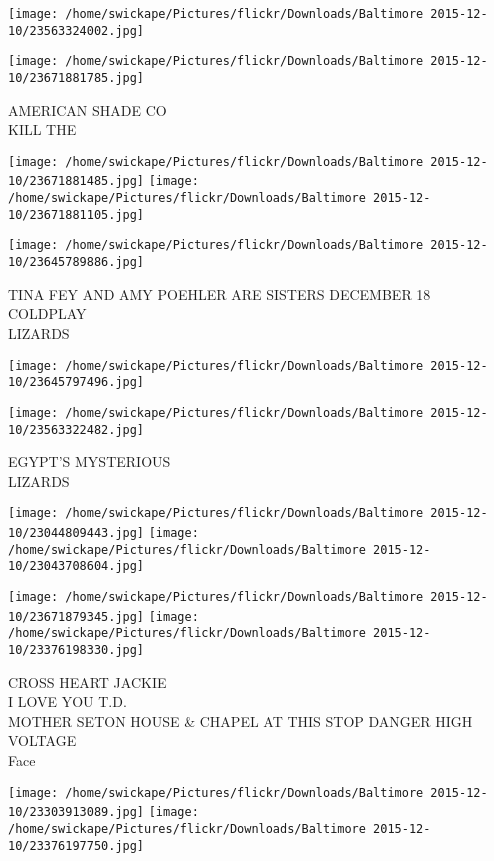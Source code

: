 \documentclass[10pt,letterpaper]{article}
\begin{document}
\texttt{[image: /home/swickape/Pictures/flickr/Downloads/Baltimore 2015-12-10/23563324002.jpg]}

\vspace{0.25in}
\texttt{[image: /home/swickape/Pictures/flickr/Downloads/Baltimore 2015-12-10/23671881785.jpg]}

AMERICAN SHADE CO\\
KILL THE
\pagebreak

\texttt{[image: /home/swickape/Pictures/flickr/Downloads/Baltimore 2015-12-10/23671881485.jpg]}
\texttt{[image: /home/swickape/Pictures/flickr/Downloads/Baltimore 2015-12-10/23671881105.jpg]}

\vspace{0.25in}
\texttt{[image: /home/swickape/Pictures/flickr/Downloads/Baltimore 2015-12-10/23645789886.jpg]}

TINA FEY AND AMY POEHLER ARE SISTERS DECEMBER 18\\
COLDPLAY\\
LIZARDS
\pagebreak

\texttt{[image: /home/swickape/Pictures/flickr/Downloads/Baltimore 2015-12-10/23645797496.jpg]}

\vspace{0.25in}
\texttt{[image: /home/swickape/Pictures/flickr/Downloads/Baltimore 2015-12-10/23563322482.jpg]}

EGYPT'S MYSTERIOUS\\
LIZARDS
\pagebreak

\texttt{[image: /home/swickape/Pictures/flickr/Downloads/Baltimore 2015-12-10/23044809443.jpg]}
\texttt{[image: /home/swickape/Pictures/flickr/Downloads/Baltimore 2015-12-10/23043708604.jpg]}

\texttt{[image: /home/swickape/Pictures/flickr/Downloads/Baltimore 2015-12-10/23671879345.jpg]}
\texttt{[image: /home/swickape/Pictures/flickr/Downloads/Baltimore 2015-12-10/23376198330.jpg]}

CROSS HEART JACKIE\\
I LOVE YOU T.D.\\
MOTHER SETON HOUSE \& CHAPEL AT THIS STOP DANGER HIGH VOLTAGE\\
Face
\pagebreak

\texttt{[image: /home/swickape/Pictures/flickr/Downloads/Baltimore 2015-12-10/23303913089.jpg]}
\texttt{[image: /home/swickape/Pictures/flickr/Downloads/Baltimore 2015-12-10/23376197750.jpg]}
\end{document}
